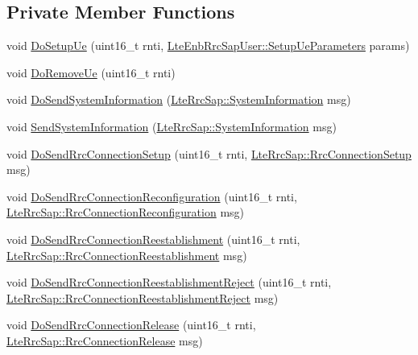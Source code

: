 \subsection*{Private Member Functions}
\begin{DoxyCompactItemize}
\item 
void \hyperlink{classns3_1_1LteEnbRrcProtocolReal_a3f0d0e9b9f5b3fa72e1a4306ecd473cf}{Do\+Setup\+Ue} (uint16\+\_\+t rnti, \hyperlink{structns3_1_1LteEnbRrcSapUser_1_1SetupUeParameters}{Lte\+Enb\+Rrc\+Sap\+User\+::\+Setup\+Ue\+Parameters} params)
\item 
void \hyperlink{classns3_1_1LteEnbRrcProtocolReal_ab3bd695204e8756a85dcb05978e313dd}{Do\+Remove\+Ue} (uint16\+\_\+t rnti)
\item 
void \hyperlink{classns3_1_1LteEnbRrcProtocolReal_a7e03d04b3442cee4c3debfbb3f8b6e74}{Do\+Send\+System\+Information} (\hyperlink{structns3_1_1LteRrcSap_1_1SystemInformation}{Lte\+Rrc\+Sap\+::\+System\+Information} msg)
\item 
void \hyperlink{classns3_1_1LteEnbRrcProtocolReal_ac63ed95805ac2898f75ac627732f5dc0}{Send\+System\+Information} (\hyperlink{structns3_1_1LteRrcSap_1_1SystemInformation}{Lte\+Rrc\+Sap\+::\+System\+Information} msg)
\item 
void \hyperlink{classns3_1_1LteEnbRrcProtocolReal_a9cfc4ed366f3438ab15829b774156130}{Do\+Send\+Rrc\+Connection\+Setup} (uint16\+\_\+t rnti, \hyperlink{structns3_1_1LteRrcSap_1_1RrcConnectionSetup}{Lte\+Rrc\+Sap\+::\+Rrc\+Connection\+Setup} msg)
\item 
void \hyperlink{classns3_1_1LteEnbRrcProtocolReal_aec373be54ef63968502a959bf69386e4}{Do\+Send\+Rrc\+Connection\+Reconfiguration} (uint16\+\_\+t rnti, \hyperlink{structns3_1_1LteRrcSap_1_1RrcConnectionReconfiguration}{Lte\+Rrc\+Sap\+::\+Rrc\+Connection\+Reconfiguration} msg)
\item 
void \hyperlink{classns3_1_1LteEnbRrcProtocolReal_ae5706b72b4de85c2ac15fd8bc17ab361}{Do\+Send\+Rrc\+Connection\+Reestablishment} (uint16\+\_\+t rnti, \hyperlink{structns3_1_1LteRrcSap_1_1RrcConnectionReestablishment}{Lte\+Rrc\+Sap\+::\+Rrc\+Connection\+Reestablishment} msg)
\item 
void \hyperlink{classns3_1_1LteEnbRrcProtocolReal_a83a875a33344dc2f71b3379cb9257f0a}{Do\+Send\+Rrc\+Connection\+Reestablishment\+Reject} (uint16\+\_\+t rnti, \hyperlink{structns3_1_1LteRrcSap_1_1RrcConnectionReestablishmentReject}{Lte\+Rrc\+Sap\+::\+Rrc\+Connection\+Reestablishment\+Reject} msg)
\item 
void \hyperlink{classns3_1_1LteEnbRrcProtocolReal_a0a94323cbc0859d4b7760c9da3b1291b}{Do\+Send\+Rrc\+Connection\+Release} (uint16\+\_\+t rnti, \hyperlink{structns3_1_1LteRrcSap_1_1RrcConnectionRelease}{Lte\+Rrc\+Sap\+::\+Rrc\+Connection\+Release} msg)

\end{DoxyCompactItemize}
